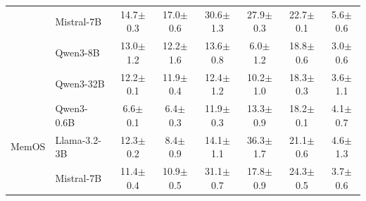 \begin{table}[t]
\begin{tabular}{@{}ll cccccc@{}}
  & Mistral-7B     & 14.7{\scriptsize$\pm$0.3} & 17.0{\scriptsize$\pm$0.6} & 30.6{\scriptsize$\pm$1.3} & 27.9{\scriptsize$\pm$0.3} & 22.7{\scriptsize$\pm$0.1} & 5.6{\scriptsize$\pm$0.6} \\

  & Qwen3-8B       & 13.0{\scriptsize$\pm$1.2} & 12.2{\scriptsize$\pm$1.6} & 13.6{\scriptsize$\pm$0.8} & 6.0{\scriptsize$\pm$1.2} & 18.8{\scriptsize$\pm$0.6} & 3.0{\scriptsize$\pm$0.6} \\

  & Qwen3-32B      & 12.2{\scriptsize$\pm$0.1} & 11.9{\scriptsize$\pm$0.4} & 12.4{\scriptsize$\pm$1.2} & 10.2{\scriptsize$\pm$1.0} & 18.3{\scriptsize$\pm$0.3} & 3.6{\scriptsize$\pm$1.1} \\
\midrule
\multirow{3}{*}{MemOS}
  & Qwen3-0.6B     & 6.6{\scriptsize$\pm$0.1} & 6.4{\scriptsize$\pm$0.3} & 11.9{\scriptsize$\pm$0.3} & 13.3{\scriptsize$\pm$0.9} & 18.2{\scriptsize$\pm$0.1} & 4.1{\scriptsize$\pm$0.7} \\

  & Llama-3.2-3B   & 12.3{\scriptsize$\pm$0.2} & 8.4{\scriptsize$\pm$0.9} & 14.1{\scriptsize$\pm$1.1} & 36.3{\scriptsize$\pm$1.7} & 21.1{\scriptsize$\pm$0.6} & 4.6{\scriptsize$\pm$1.3} \\

  & Mistral-7B     & 11.4{\scriptsize$\pm$0.4} & 10.9{\scriptsize$\pm$0.5} & 31.1{\scriptsize$\pm$0.7} & 17.8{\scriptsize$\pm$0.9} & 24.3{\scriptsize$\pm$0.5} & 3.7{\scriptsize$\pm$0.6} \\
\bottomrule
\end{tabular}
\end{table}
